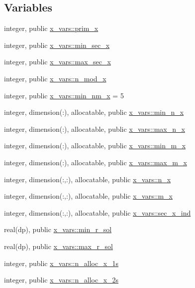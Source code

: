 \subsection*{Variables}
\begin{DoxyCompactItemize}
\item 
integer, public \hyperlink{namespacex__vars_ae7f7061534fb3ad68a538cdcea20d1d9}{x\+\_\+vars\+::prim\+\_\+x}
\item 
integer, public \hyperlink{namespacex__vars_a0d63825aabc4c71623c6ea7ffe033949}{x\+\_\+vars\+::min\+\_\+sec\+\_\+x}
\item 
integer, public \hyperlink{namespacex__vars_ae19ca528c5688228ff20912a45290b2a}{x\+\_\+vars\+::max\+\_\+sec\+\_\+x}
\item 
integer, public \hyperlink{namespacex__vars_a2e8fe6c5fe1cf61704bf176925d2b02e}{x\+\_\+vars\+::n\+\_\+mod\+\_\+x}
\item 
integer, public \hyperlink{namespacex__vars_adec89f548ba63e203297222dce675b94}{x\+\_\+vars\+::min\+\_\+nm\+\_\+x} = 5
\item 
integer, dimension(\+:), allocatable, public \hyperlink{namespacex__vars_a07485e5ebf54c236ae6f3c25e9cd2a93}{x\+\_\+vars\+::min\+\_\+n\+\_\+x}
\item 
integer, dimension(\+:), allocatable, public \hyperlink{namespacex__vars_a2f04400f8c1489db3f2d66fa972852a5}{x\+\_\+vars\+::max\+\_\+n\+\_\+x}
\item 
integer, dimension(\+:), allocatable, public \hyperlink{namespacex__vars_aae62c7b4f8043dcccad97454b5857690}{x\+\_\+vars\+::min\+\_\+m\+\_\+x}
\item 
integer, dimension(\+:), allocatable, public \hyperlink{namespacex__vars_aad66540f255243f66887442b9ef3c745}{x\+\_\+vars\+::max\+\_\+m\+\_\+x}
\item 
integer, dimension(\+:,\+:), allocatable, public \hyperlink{namespacex__vars_a61797a50c8f2d1cac7431894fe6d6ec0}{x\+\_\+vars\+::n\+\_\+x}
\item 
integer, dimension(\+:,\+:), allocatable, public \hyperlink{namespacex__vars_a23179dd22962147dfd992e800f0dfcc4}{x\+\_\+vars\+::m\+\_\+x}
\item 
integer, dimension(\+:,\+:), allocatable, public \hyperlink{namespacex__vars_afb8de8db92ae273f2581e0545370ecac}{x\+\_\+vars\+::sec\+\_\+x\+\_\+ind}
\item 
real(dp), public \hyperlink{namespacex__vars_a50c610efcf5afa4ec4b0eb7119b5d520}{x\+\_\+vars\+::min\+\_\+r\+\_\+sol}
\item 
real(dp), public \hyperlink{namespacex__vars_a0f45dfddb928623424eeb8b8bdd2b0f9}{x\+\_\+vars\+::max\+\_\+r\+\_\+sol}
\item 
integer, public \hyperlink{namespacex__vars_af565ad5c65071b130e69d528aa6faf1d}{x\+\_\+vars\+::n\+\_\+alloc\+\_\+x\+\_\+1s}
\item 
integer, public \hyperlink{namespacex__vars_add0d925899063fbe0c4ff05d21f35a23}{x\+\_\+vars\+::n\+\_\+alloc\+\_\+x\+\_\+2s}
\end{DoxyCompactItemize}


